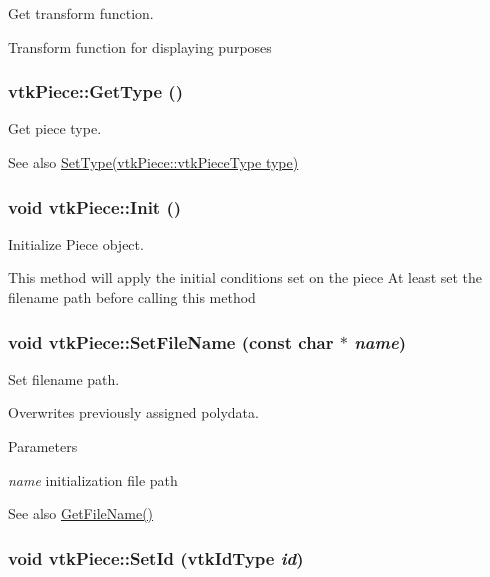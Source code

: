 Get transform function. 

Transform function for displaying purposes \hypertarget{classvtkPiece_a337c7aa8f4c6a65cee2f436eedc29038}{
\subsubsection[{GetType}]{ vtkPiece::GetType ()}}
\label{classvtkPiece_a337c7aa8f4c6a65cee2f436eedc29038}


Get piece type. 

\begin{DoxySeeAlso}{See also}
\hyperlink{classvtkPiece_a19bed21306aacd30f7890ff6d364d025}{SetType(vtkPiece::vtkPieceType type)} 
\end{DoxySeeAlso}
\hypertarget{classvtkPiece_abe0c1a250c1bcae71f5513153d1bb395}{
\subsubsection[{Init}]{\setlength{\rightskip}{0pt plus 5cm}void vtkPiece::Init ()}}
\label{classvtkPiece_abe0c1a250c1bcae71f5513153d1bb395}


Initialize Piece object. 

This method will apply the initial conditions set on the piece At least set the filename path before calling this method \hypertarget{classvtkPiece_a6bd1ffdbd75747966f41c7dfee8f8b4d}{
\subsubsection[{SetFileName}]{\setlength{\rightskip}{0pt plus 5cm}void vtkPiece::SetFileName (const char $\ast$ {\em name})}}
\label{classvtkPiece_a6bd1ffdbd75747966f41c7dfee8f8b4d}


Set filename path. 

Overwrites previously assigned polydata. 
\begin{DoxyParams}{Parameters}
\item[{\em name}]initialization file path \end{DoxyParams}
\begin{DoxySeeAlso}{See also}
\hyperlink{classvtkPiece_a1a91d9507576694b80da93c1ce7c3861}{GetFileName()} 
\end{DoxySeeAlso}
\hypertarget{classvtkPiece_a077a58755fe796f485c25e3ecda1e994}{
\subsubsection[{SetId}]{\setlength{\rightskip}{0pt plus 5cm}void vtkPiece::SetId (vtkIdType {\em id})}}
\label{classvtkPiece_a077a58755fe796f485c25e3ecda1e994}


